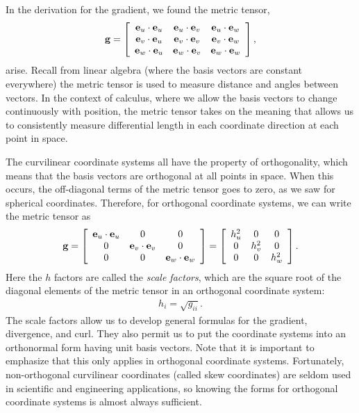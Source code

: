 In the derivation for the gradient, we found the metric tensor,
\begin{align}
  \mathbf{g} = \left[ \begin{array}{c c c} 
  \mathbf{e}_u \cdot \mathbf{e}_u & \mathbf{e}_u \cdot \mathbf{e}_v & \mathbf{e}_u \cdot \mathbf{e}_w \\
  \mathbf{e}_v \cdot \mathbf{e}_u & \mathbf{e}_v \cdot \mathbf{e}_v & \mathbf{e}_v \cdot \mathbf{e}_w \\
  \mathbf{e}_w \cdot \mathbf{e}_u & \mathbf{e}_w \cdot \mathbf{e}_v & \mathbf{e}_w \cdot \mathbf{e}_w \\ \end{array} \right] ,
\end{align}
arise. Recall from linear algebra (where the basis vectors are constant everywhere) the metric tensor is used to measure distance and angles between vectors. In the context of calculus, where we allow the basis vectors to change continuously with position, the metric tensor takes on the meaning that allows us to consistently measure differential length in each coordinate direction at each point in space.

The curvilinear coordinate systems all have the property of orthogonality, which means that the basis vectors are orthogonal at all points in space. When this occurs, the off-diagonal terms of the metric tensor goes to zero, as we saw for spherical coordinates. Therefore, for orthogonal coordinate systems, we can write the metric tensor as
\begin{align}
  \mathbf{g} = \left[ \begin{array}{c c c} 
  \mathbf{e}_u \cdot \mathbf{e}_u & 0                     & 0                     \\
                      0 & \mathbf{e}_v \cdot \mathbf{e}_v & 0                     \\
                      0 &                     0 & \mathbf{e}_w \cdot \mathbf{e}_w \\ \end{array} \right]
  = \left[ \begin{array}{c c c} 
  h_u^2 &     0 &     0  \\
      0 & h_v^2 &     0 \\
      0 &     0 & h_w^2 \\ \end{array} \right] .
\end{align}
Here the $h$ factors are called the \emph{scale factors}, which are the square root of the diagonal elements of the metric tensor in an orthogonal coordinate system: 
\begin{align}
  h_i = \sqrt{ g_{ii} } .
\end{align}
The scale factors allow us to develop general formulas for the gradient, divergence, and curl. They also permit us to put the coordinate systems into an orthonormal form having unit basis vectors. Note that it is important to emphasize that this only applies in orthogonal coordinate systems. Fortunately, non-orthogonal curvilinear coordinates (called skew coordinates) are seldom used in scientific and engineering applications, so knowing the forms for orthogonal coordinate systems is almost always sufficient.

